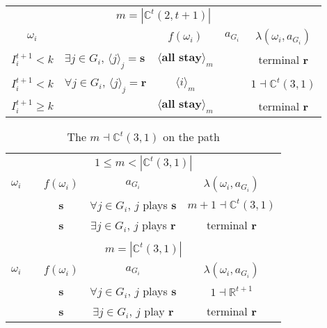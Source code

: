 \documentclass[12pt,letter]{article}
\newcommand{\Kappa}{\mathbb{C}}
\newcommand{\Omicron}{\mathbb{R}}
\theoremstyle{definition}
\theoremstyle{remark}
\theoremstyle{claim}
\begin{document}
\begin{table}[!htbp]
\begin{center}
\begin{tabular}{c l | c | c | c}
\multicolumn{5}{c}{$m= |\Kappa^t(2,t+1)|$}\\
$\omega_i$ 	 & 	   &	$f(\omega_i)$  &	$a_{G_i}$ & $\lambda(\omega_i,a_{G_i})$ \\
\hline
\hline
$I^{t+1}_i< k$  	& 	$\exists j\in G_i$, $\langle j \rangle_j=\textbf{s}$	& $\langle \textbf{all stay} \rangle_m$		&  	& terminal \textbf{r}\\
$I^{t+1}_i< k$  	& 	$\forall j\in G_i$, $\langle j \rangle_j=\textbf{r}$	& $\langle i \rangle_m$		&  	& $1\dashv \Kappa^t(3,1)$\\
$I^{t+1}_i\geq k$	 & 				& $\langle \textbf{all stay} \rangle_m$ 	& 		& terminal \textbf{r}\\
\hline
\end{tabular}
\end{center}
\end{table}




\clearpage









\begin{table}[!htbp]
\caption{The $m\dashv\Kappa^t(3,1)$ on the path}
\label{table:eqm_path_kt3}
\begin{center}
\begin{tabular}{c c | c | c | c}
\multicolumn{5}{c}{$1\leq m < |\Kappa^t(3,1)|$}\\
$\omega_i$ 	 & 	   &	$f(\omega_i)$  &	$a_{G_i}$ & $\lambda(\omega_i,a_{G_i})$ \\
\hline
\hline
  	&	& \textbf{s} & $\forall j\in G_i$, $j$ plays $\textbf{s}$ 	& $m+1\dashv \Kappa^t(3,1)$\\
  	&  & \textbf{s}  &  $\exists j\in G_i$, $j$ plays $\textbf{r}$  	& terminal \textbf{r}\\
\hline
\\
\multicolumn{5}{c}{$m= |\Kappa^t(3,1)|$}\\
$\omega_i$ 	 & 	   &	$f(\omega_i)$  &	$a_{G_i}$ & $\lambda(\omega_i,a_{G_i})$ \\
\hline
\hline
 	& 	& \textbf{s} & $\forall j\in G_i$, $j$ plays $\textbf{s}$ 	& $1\dashv \Omicron^{t+1}$\\
  	&  & \textbf{s}  &  $\exists j\in G_i$, $j$ play $\textbf{r}$  	& terminal \textbf{r}\\
\hline
\end{tabular}
\end{center}
\end{table}
\end{document}
